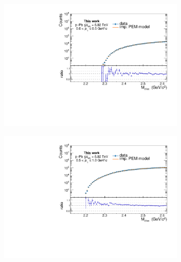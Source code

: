 \begin{appendices}
\begin{figure}[!h]
\begin{subfigure}{.5\textwidth}
  \centering
  \captionsetup{justification=centering}
  \includegraphics[width=\linewidth]{gfx/appendix/backsub/can_unblind0}
  \caption{}
\end{subfigure}%
\begin{subfigure}{.5\textwidth}
  \centering
  \captionsetup{justification=centering}
  \includegraphics[width=\linewidth]{gfx/appendix/backsub/can_unblind1}
  \caption{}
\end{subfigure}
\begin{subfigure}{.5\textwidth}
  \centering
  \captionsetup{justification=centering}

\end{subfigure}
\end{figure}
\end{appendices}
